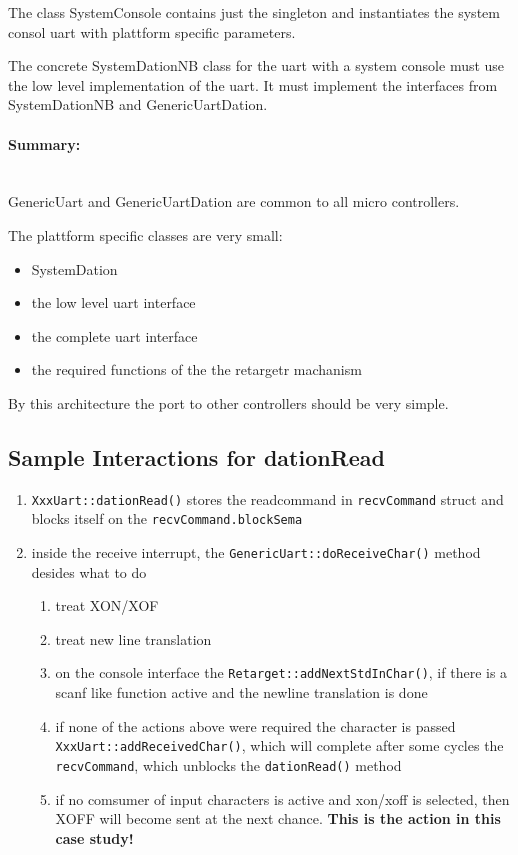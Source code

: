 The class SystemConsole contains just the singleton and instantiates 
the system consol uart with plattform specific parameters.

The concrete SystemDationNB class for the uart with a system console
must use the low level implementation  of the uart. It must implement
the interfaces from SystemDationNB and GenericUartDation. 

\paragraph{Summary:}\ \\
GenericUart and GenericUartDation  are common to all micro
 controllers.

The plattform specific classes are very small:

\begin{itemize}
\item SystemDation
\item the low level uart interface
\item the complete uart interface
\item the  required functions of the the retargetr machanism
\end{itemize}

By this architecture the port to other controllers should be very simple.

\subsection{Sample Interactions for dationRead}
\begin{enumerate}
\item \texttt{XxxUart::dationRead()} stores the readcommand in \texttt{recvCommand} struct and 
     blocks itself on the \texttt{recvCommand.blockSema}
\item inside the receive interrupt, the \texttt{GenericUart::doReceiveChar()} method
    desides what to do
    \begin{enumerate}
    \item treat XON/XOF
    \item treat new line translation
    \item on the console interface the \texttt{Retarget::addNextStdInChar()}, if there is a scanf
        like function active and the newline translation is done\newline
    \item if none of the actions above were required the character is passed 
         \texttt{XxxUart::addReceivedChar()}, which will complete after some cycles the \texttt{recvCommand},
        which unblocks the \texttt{dationRead()} method
    \item if no comsumer of input characters is active and xon/xoff is selected, then XOFF will become
        sent at the next chance.
        \textbf{This is the action in this case study!}
    \end{enumerate}
\end{enumerate}


